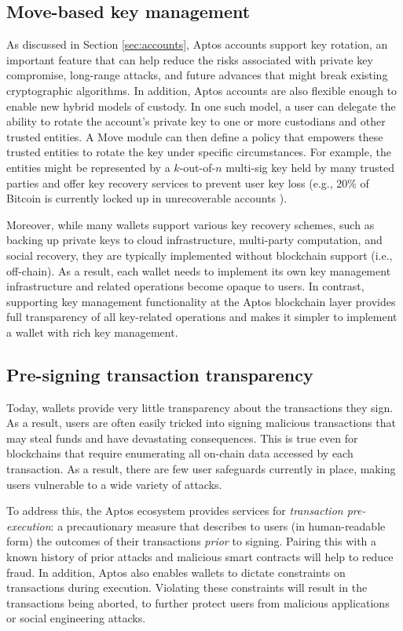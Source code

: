 \documentclass{article}
\begin{document}
\subsection{Move-based key management}

As discussed in Section \ref{sec:accounts}, Aptos accounts support key rotation, an important feature that can help reduce the risks associated with private key compromise, long-range attacks, and future advances that might break existing cryptographic algorithms.  In addition, Aptos accounts are also flexible enough to enable new hybrid models of custody. In one such model, a user can delegate the ability to rotate the account's private key to one or more custodians and other trusted entities. A Move module can then define a policy that empowers these trusted entities to rotate the key under specific circumstances. For example, the entities might be represented by a $k$-out-of-$n$ multi-sig key held by many trusted parties and offer key recovery services to prevent user key loss (e.g., 20\% of Bitcoin is currently locked up in unrecoverable accounts \cite{lost_passwords}). 

Moreover, while many wallets support various key recovery schemes, such as backing up private keys to cloud infrastructure, multi-party computation, and social recovery, they are typically implemented without blockchain support (i.e., off-chain). As a result, each wallet needs to implement its own key management infrastructure and related operations become opaque to users. In contrast, supporting key management functionality at the Aptos blockchain layer provides full transparency of all key-related operations and makes it simpler to implement a wallet with rich key management.

\subsection{Pre-signing transaction transparency}

Today, wallets provide very little transparency about the transactions they sign. As a result, users are often easily tricked into signing malicious transactions that may steal funds and have devastating consequences. This is true even for blockchains that require enumerating all on-chain data accessed by each transaction. As a result, there are few user safeguards currently in place, making users vulnerable to a wide variety of attacks. 

To address this, the Aptos ecosystem provides services for \emph{transaction pre-execution}: a precautionary measure that describes to users (in human-readable form) the outcomes of their transactions \emph{prior} to signing. Pairing this with a known history of prior attacks and malicious smart contracts will help to reduce fraud. In addition, Aptos also enables wallets to dictate constraints on transactions during execution. Violating these constraints will result in the transactions being aborted, to further protect users from malicious applications or social engineering attacks.
\end{document}
